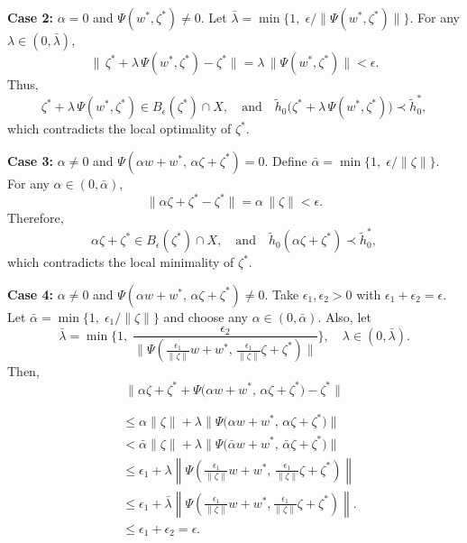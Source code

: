 \documentclass[12pt, reqno]{amsart}
\theoremstyle{definition}
\theoremstyle{remark}
\numberwithin{equation}{section}
\begin{document}
\vspace{0.2cm}
\noindent
\textbf{Case 2:} $\alpha = 0$ and $\Psi(w^*, \zeta^*) \neq 0$.  
Let $\bar{\lambda} = \min\!\big\{1,\; \epsilon/\|\Psi(w^*, \zeta^*)\|\big\}$. For any $\lambda \in (0, \bar{\lambda})$,
\[
\big\|\, \zeta^* + \lambda\, \Psi(w^*, \zeta^*) - \zeta^* \big\| = \lambda\, \|\Psi(w^*, \zeta^*)\| < \epsilon.
\]
Thus,
\[
\zeta^* + \lambda\, \Psi(w^*, \zeta^*) \in B_\epsilon(\zeta^*) \cap X,\quad \text{and} \quad \tilde{h}_0\!\big(\zeta^* + \lambda\, \Psi(w^*, \zeta^*)\big) \prec \tilde{h}_0^*,
\]
which contradicts the local optimality of $\zeta^*$.

\vspace{0.2cm}
\noindent
\textbf{Case 3:} $\alpha \neq 0$ and $\Psi(\alpha w + w^*,\, \alpha \zeta + \zeta^*) = 0$.  
Define $\bar{\alpha} = \min\!\big\{1,\; \epsilon/\|\zeta\|\big\}$. For any $\alpha \in (0, \bar{\alpha})$,
\[
\|\alpha \zeta + \zeta^* - \zeta^*\| = \alpha\, \|\zeta\| < \epsilon.
\]
Therefore,
\[
\alpha \zeta + \zeta^* \in B_\epsilon(\zeta^*) \cap X,\quad \text{and} \quad \tilde{h}_0(\alpha \zeta + \zeta^*) \prec \tilde{h}_0^*,
\]
which contradicts the local minimality of $\zeta^*$.

\vspace{0.2cm}
\noindent
\textbf{Case 4:} $\alpha \neq 0$ and $\Psi(\alpha w + w^*,\, \alpha \zeta + \zeta^*) \neq 0$.  
Take $\epsilon_1, \epsilon_2 > 0$ with $\epsilon_1 + \epsilon_2 = \epsilon$. Let $\bar{\alpha} = \min\!\big\{1,\; \epsilon_1/\|\zeta\|\big\}$ and choose any $\alpha \in (0, \bar{\alpha})$. Also, let
\[
\bar{\lambda} = \min\!\Big\{1,\; \frac{\epsilon_2}{\|\Psi(\frac{\epsilon_1}{\|\zeta\|} w + w^*,\, \frac{\epsilon_1}{\|\zeta\|} \zeta + \zeta^*)\|}\Big\},
\quad \lambda \in (0, \bar{\lambda}).
\]
Then,
\[
\| {\alpha} \mathit{\zeta} + \mathit{\zeta}^{*} + {\Psi}\big( {\alpha} w + w^{*},\, {\alpha} \mathit{\zeta} + \mathit{\zeta}^{*} \big) - \mathit{\zeta}^{*} \|
\]

\begin{equation*}
    \begin{aligned}
        &\leq {\alpha} \| \mathit{\zeta} \| + {\lambda} \| {\Psi} \big( {\alpha} w + w^{*},\, {\alpha} \mathit{\zeta} + \mathit{\zeta}^{*} \big) \| \\ 
&< \bar{{\alpha}} \| \mathit{\zeta} \| + {\lambda} \| {\Psi} \big( \bar{{\alpha}} w + w^{*},\, \bar{{\alpha}} \mathit{\zeta} + \mathit{\zeta}^{*} \big) \| \\ 
&\leq \epsilon_{1} + {\lambda} \left\| {\Psi} \left( \frac{\epsilon_{1}}{\| \mathit{\zeta} \|} w + w^{*},\, \frac{\epsilon_{1}}{\| \mathit{\zeta} \|} \mathit{\zeta} + \mathit{\zeta}^{*} \right) \right\|\\
&\leq\epsilon_{1}+\bar{ {\lambda}}\left\| {\Psi}\left(\frac{\epsilon_{1}}{\|\mathit{\zeta}\|} w+w^{*},\frac{\epsilon_{1}}{\|\mathit{\zeta}\|} \mathit{\zeta}+\mathit{\zeta}^{*}\right)\right\|.\\
       		&\leq\epsilon_{1}+\epsilon_{2}=\epsilon.
    \end{aligned}
\end{equation*}
\end{document}
